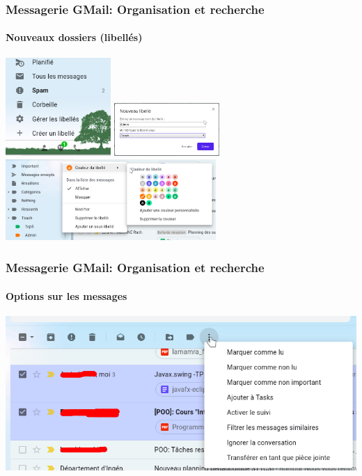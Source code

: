 \documentclass[xcolor=table]{beamer}
\begin{document}
\begin{frame}
\frametitle{Messagerie GMail: Organisation et recherche}
\framesubtitle{Nouveaux dossiers (libellés)}
\includegraphics[width=4cm]{..//img/Bweb02-ri-gmail/gmail-label1.png}
\includegraphics[width=4cm]{..//img/Bweb02-ri-gmail/gmail-label2.png}
\includegraphics[width=8cm]{..//img/Bweb02-ri-gmail/gmail-label3.png}
\end{frame}

\begin{frame}
\frametitle{Messagerie GMail: Organisation et recherche}
\framesubtitle{Options sur les messages}

\begin{center}
	\includegraphics[height=.65\textheight]{..//img/Bweb02-ri-gmail/gmail-options.png}
\end{center}

\end{frame}
\end{document}
